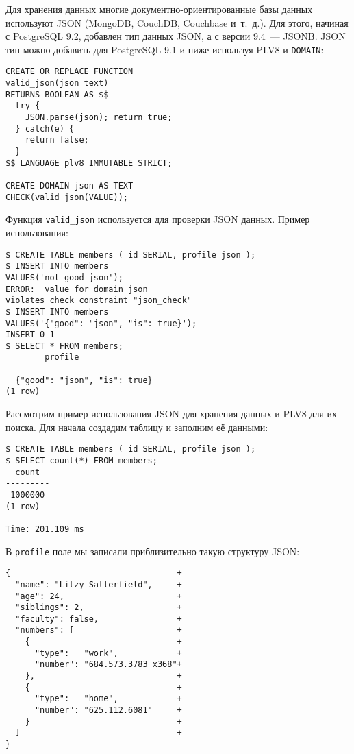 Для хранения данных многие документно-ориентированные базы данных используют JSON (MongoDB, CouchDB, Couchbase и~т.~д.). Для этого, начиная с PostgreSQL 9.2, добавлен тип данных JSON, а с версии 9.4~--- JSONB. JSON тип можно добавить для PostgreSQL 9.1 и ниже используя PLV8 и \lstinline!DOMAIN!:

\begin{lstlisting}[label=lst:plv8js7,caption=Создание типа JSON]
CREATE OR REPLACE FUNCTION
valid_json(json text)
RETURNS BOOLEAN AS $$
  try {
    JSON.parse(json); return true;
  } catch(e) {
    return false;
  }
$$ LANGUAGE plv8 IMMUTABLE STRICT;

CREATE DOMAIN json AS TEXT
CHECK(valid_json(VALUE));
\end{lstlisting}

Функция \lstinline!valid_json! используется для проверки JSON данных. Пример использования:

\begin{lstlisting}[label=lst:plv8js8,caption=Проверка JSON]
$ CREATE TABLE members ( id SERIAL, profile json );
$ INSERT INTO members
VALUES('not good json');
ERROR:  value for domain json
violates check constraint "json_check"
$ INSERT INTO members
VALUES('{"good": "json", "is": true}');
INSERT 0 1
$ SELECT * FROM members;
	    profile
------------------------------
  {"good": "json", "is": true}
(1 row)
\end{lstlisting}

Рассмотрим пример использования JSON для хранения данных и PLV8 для их поиска. Для начала создадим таблицу и заполним её данными:

\begin{lstlisting}[label=lst:plv8js9,caption=Таблица с JSON полем]
$ CREATE TABLE members ( id SERIAL, profile json );
$ SELECT count(*) FROM members;
  count
---------
 1000000
(1 row)

Time: 201.109 ms
\end{lstlisting}

В \lstinline!profile! поле мы записали приблизительно такую структуру JSON:

\begin{lstlisting}[label=lst:plv8js10,caption=JSON структура]
{                                  +
  "name": "Litzy Satterfield",     +
  "age": 24,                       +
  "siblings": 2,                   +
  "faculty": false,                +
  "numbers": [                     +
    {                              +
      "type":   "work",            +
      "number": "684.573.3783 x368"+
    },                             +
    {                              +
      "type":   "home",            +
      "number": "625.112.6081"     +
    }                              +
  ]                                +
}
\end{lstlisting}

